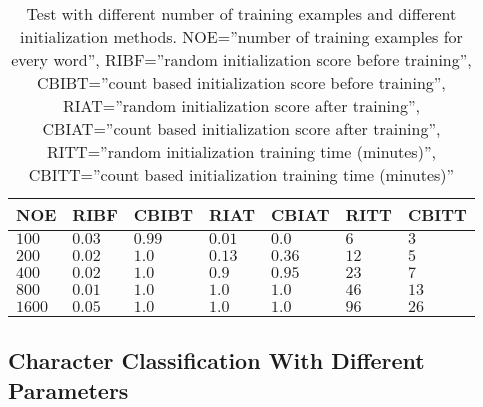 \begin{table}[htb]
  \begin{center}
  \begin{tabular}{ l l l l l l l }
    NOE    & RIBF   & CBIBT  & RIAT    & CBIAT  & RITT & CBITT \\ \hline
    $100$  & $0.03$ & $0.99$ & $0.01$  & $0.0$  & $6$  & $3$\\ 
    $200$  & $0.02$ & $1.0$  & $0.13$  & $0.36$ & $12$ & $5$\\ 
    $400$  & $0.02$ & $1.0$  & $0.9$   & $0.95$ & $23$ & $7$\\
    $800$  & $0.01$ & $1.0$  & $1.0$   & $1.0$  & $46$ & $13$\\   
    $1600$ & $0.05$ & $1.0$  & $1.0$   & $1.0$  & $96$ & $26$\\  
  \end{tabular}
\end{center}
\caption{Test with different number of training examples and different initialization methods.
	 NOE=''number of training examples for every word'',
         RIBF=''random initialization score before training'',
         CBIBT=''count based initialization score before training'',
         RIAT=''random initialization score after training'',
         CBIAT=''count based initialization score after training'',
         RITT=''random initialization training time (minutes)'',
         CBITT=''count based initialization training time (minutes)''} 
\label{tab:word_classifier_results_generated_data} 
\end{table}

\subsection{Character Classification With Different Parameters}

